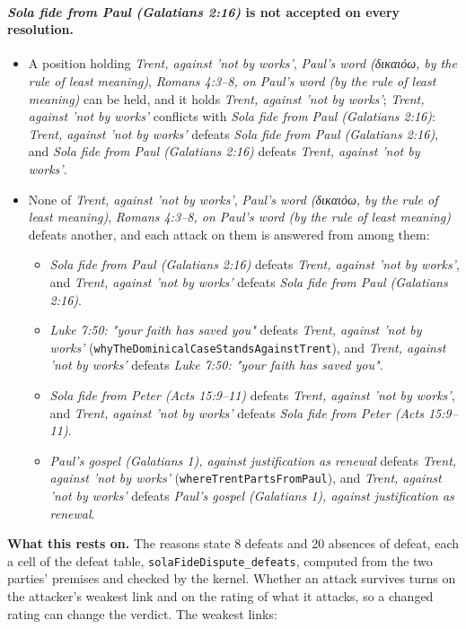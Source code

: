 \documentclass[11pt]{article}
\begin{document}
\paragraph{\emph{Sola fide from Paul (Galatians 2:16)} is not accepted on every resolution.}
\begin{itemize}
\item A position holding \emph{Trent, against 'not by works'}, \emph{Paul's word (δικαιόω, by the rule of least meaning)}, \emph{Romans 4:3–8, on Paul's word (by the rule of least meaning)} can be held, and it holds \emph{Trent, against 'not by works'}; \emph{Trent, against 'not by works'} conflicts with \emph{Sola fide from Paul (Galatians 2:16)}: \emph{Trent, against 'not by works'} defeats \emph{Sola fide from Paul (Galatians 2:16)}, and \emph{Sola fide from Paul (Galatians 2:16)} defeats \emph{Trent, against 'not by works'}.
\item None of \emph{Trent, against 'not by works'}, \emph{Paul's word (δικαιόω, by the rule of least meaning)}, \emph{Romans 4:3–8, on Paul's word (by the rule of least meaning)} defeats another, and each attack on them is answered from among them:
\begin{itemize}
\item \emph{Sola fide from Paul (Galatians 2:16)} defeats \emph{Trent, against 'not by works'}, and \emph{Trent, against 'not by works'} defeats \emph{Sola fide from Paul (Galatians 2:16)}.
\item \emph{Luke 7:50: "your faith has saved you"} defeats \emph{Trent, against 'not by works'} (\texttt{why\allowbreak{}The\allowbreak{}Dominical\allowbreak{}Case\allowbreak{}Stands\allowbreak{}Against\allowbreak{}Trent}), and \emph{Trent, against 'not by works'} defeats \emph{Luke 7:50: "your faith has saved you"}.
\item \emph{Sola fide from Peter (Acts 15:9–11)} defeats \emph{Trent, against 'not by works'}, and \emph{Trent, against 'not by works'} defeats \emph{Sola fide from Peter (Acts 15:9–11)}.
\item \emph{Paul's gospel (Galatians 1), against justification as renewal} defeats \emph{Trent, against 'not by works'} (\texttt{where\allowbreak{}Trent\allowbreak{}Parts\allowbreak{}From\allowbreak{}Paul}), and \emph{Trent, against 'not by works'} defeats \emph{Paul's gospel (Galatians 1), against justification as renewal}.
\end{itemize}
\end{itemize}
\par\noindent\textbf{What this rests on.} The reasons state 8 defeats and 20 absences of defeat, each a cell of the defeat table, \texttt{sola\allowbreak{}Fide\allowbreak{}Dispute\_\allowbreak{}defeats}, computed from the two parties' premises and checked by the kernel. Whether an attack survives turns on the attacker's weakest link and on the rating of what it attacks, so a changed rating can change the verdict. The weakest links:
\end{document}
